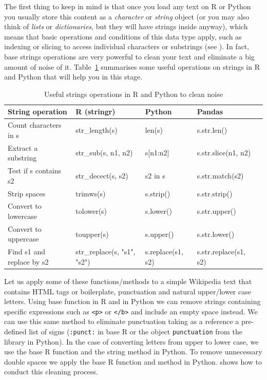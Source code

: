 The first thing to keep in mind is that once you load any text on R or Python you usually store this content as a \emph{character} or \emph{string} object (or you may also think of \emph{lists} or \emph{dictionaries}, but they will have strings inside anyway), which means that basic operations and conditions of this data type apply, such as indexing or slicing to access individual characters or substrings (see ). In fact, base strings operations are very powerful to clean your text and eliminate a big amount of noise of it.  Table~\ref{tab:stringoperations} summarises some useful operations on strings in R and Python that will help you in this stage.   

\begin{table}
  \caption{\label{tab:stringoperations}Useful strings operations in R and Python to clean noise}{
  \begin{tabularx}{\textwidth}{lllll}
    \toprule
    String operation      & R (stringr)  & Python & Pandas\\
    \midrule
Count characters in s & str\_length(s)          & len(s)        & s.str.len()  \\
Extract a substring   & str\_sub(s, n1, n2)     & s[n1:n2] & s.str.slice(n1, n2) \\
Test if s contains s2 & str\_decect(s, s2)       & s2 in s       & s.str.match(s2) \\
Strip spaces          & trimws(s)               & s.strip()     & s.str.strip() \\
Convert to lowercase  & tolower(s)              & s.lower()     & s.str.upper() \\ 
Convert to uppercase  & toupper(s)              & s.upper()     & s.str.lower() \\ 
Find s1 and replace by s2 & str\_replace(s, "s1", "s2") & s.replace(s1, s2) & s.str.replace(s1, s2)  \\ 
    \bottomrule
  \end{tabularx}}{}
\end{table}

Let us apply some of these functions/methods to a simple Wikipedia text that contains HTML tags or boilerplate, punctuation and natural upper/lower case letters. Using base function  in R and  in Python we can remove strings containing specific expressions such as \texttt{<p>} or \texttt{</b>} and include an empty space instead. We can use this same method to eliminate punctuation taking as a reference a pre-defined list of signs (\texttt{:punct:} in base R or the object \texttt{punctuation} from the library  in Python). In the case of converting letters from upper to lower case, we use the base R function  and the string method  in Python. To remove unnecessary double spaces we apply the base R function  and method  in Python.  shows how to conduct this cleaning process.

